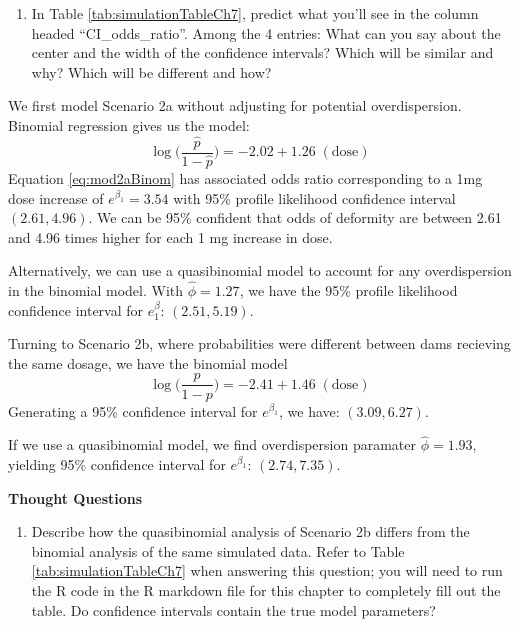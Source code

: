 \documentclass[
]{krantz}
\providecommand{\tightlist}{%
  \setlength{\itemsep}{0pt}\setlength{\parskip}{0pt}}
\renewenvironment{quote}{\begin{VF}}{\end{VF}}
\begin{document}
\begin{quote}
\begin{enumerate}
\def\labelenumi{\arabic{enumi}.}
\setcounter{enumi}{7}
\tightlist
\item
  In Table \ref{tab:simulationTableCh7}, predict what you'll see in the column headed ``CI\_odds\_ratio''. Among the 4 entries: What can you say about the center and the width of the confidence intervals? Which will be similar and why? Which will be different and how?
\end{enumerate}
\end{quote}

We first model Scenario 2a without adjusting for potential overdispersion. Binomial regression gives us the model:
\begin{equation}
  \log\bigg( \frac{\hat{p}}{1-\hat{p}} \bigg) = -2.02 + 1.26\;(\textrm{dose})
  \label{eq:mod2aBinom}
\end{equation}
Equation \eqref{eq:mod2aBinom} has associated odds ratio corresponding to a 1mg dose increase of \(e^{\beta_1} = 3.54\) with 95\% profile likelihood confidence interval \((2.61, 4.96)\). We can be 95\% confident that odds of deformity are between 2.61 and 4.96 times higher for each 1 mg increase in dose.

Alternatively, we can use a quasibinomial model to account for any overdispersion in the binomial model. With \(\widehat{\phi} = 1.27\), we have the 95\% profile likelihood confidence interval for \(e^\beta_1\): \((2.51, 5.19)\).

Turning to Scenario 2b, where probabilities were different between dams recieving the same dosage, we have the binomial model
\begin{equation}
  \log\bigg( \frac{p}{1-p} \bigg) = -2.41 + 1.46\;(\textrm{dose})
  \label{eq:mod2bBinom}
\end{equation}
Generating a 95\% confidence interval for \(e^{\beta_1}\), we have: \((3.09, 6.27)\).

If we use a quasibinomial model, we find overdispersion paramater \(\widehat{\phi} = 1.93\), yielding 95\% confidence interval for \(e^{\beta_1}\): \((2.74, 7.35)\).

\textbf{Thought Questions}

\begin{quote}
\begin{enumerate}
\def\labelenumi{\arabic{enumi}.}
\setcounter{enumi}{8}
\tightlist
\item
  Describe how the quasibinomial analysis of Scenario 2b differs from the binomial analysis of the same simulated data. Refer to Table \ref{tab:simulationTableCh7} when answering this question; you will need to run the R code in the R markdown file for this chapter to completely fill out the table. Do confidence intervals contain the true model parameters?
\end{enumerate}
\end{quote}
\end{document}

